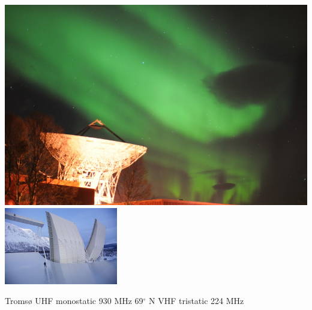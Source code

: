 \begin{frame}[t,fragile]
\frametitle{\hfill}
\vspace{\mytopbit}
\newlength{\picsize}
\setlength{\picsize}{1.1in}

\begin{center}
{
\includegraphics[height=\picsize]{uhf-tro-aurora.jpg}
\includegraphics[height=\picsize,width=1.95in]{eiscat-vhf.jpg}

{\scriptsize Troms{\o} UHF monostatic 930 MHz 69$^\circ$ N \hfill VHF tristatic 224 MHz}

}
\end{center}
\end{frame}
